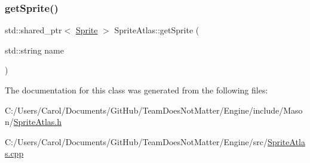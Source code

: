 \subsubsection{\texorpdfstring{get\+Sprite()}{getSprite()}}
{\footnotesize\ttfamily std\+::shared\+\_\+ptr$<$ \hyperlink{class_mason_1_1_sprite}{Sprite} $>$ Sprite\+Atlas\+::get\+Sprite (\begin{DoxyParamCaption}\item[{std\+::string}]{name }\end{DoxyParamCaption})}



The documentation for this class was generated from the following files\+:\begin{DoxyCompactItemize}
\item 
C\+:/\+Users/\+Carol/\+Documents/\+Git\+Hub/\+Team\+Does\+Not\+Matter/\+Engine/include/\+Mason/\hyperlink{_sprite_atlas_8h}{Sprite\+Atlas.\+h}\item 
C\+:/\+Users/\+Carol/\+Documents/\+Git\+Hub/\+Team\+Does\+Not\+Matter/\+Engine/src/\hyperlink{_sprite_atlas_8cpp}{Sprite\+Atlas.\+cpp}\end{DoxyCompactItemize}
